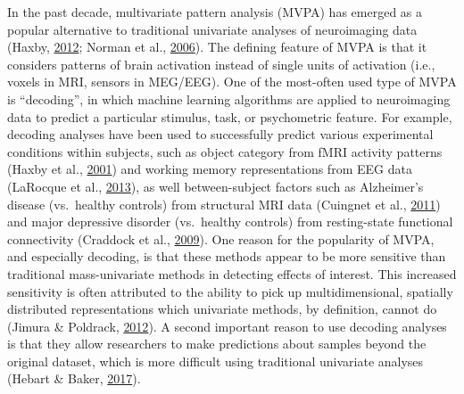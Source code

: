 \documentclass[12pt,american,a4paper,oneside,]{memoir} %
\begin{document}
In the past decade, multivariate pattern analysis (MVPA) has emerged as a popular alternative to traditional univariate analyses of neuroimaging data (Haxby, \protect\hyperlink{ref-Haxby2012-sd}{2012}; Norman et al., \protect\hyperlink{ref-norman2006beyond}{2006}). The defining feature of MVPA is that it considers patterns of brain activation instead of single units of activation (i.e., voxels in MRI, sensors in MEG/EEG). One of the most-often used type of MVPA is ``decoding'', in which machine learning algorithms are applied to neuroimaging data to predict a particular stimulus, task, or psychometric feature. For example, decoding analyses have been used to successfully predict various experimental conditions within subjects, such as object category from fMRI activity patterns (Haxby et al., \protect\hyperlink{ref-Haxby2001-os}{2001}) and working memory representations from EEG data (LaRocque et al., \protect\hyperlink{ref-LaRocque2013-sh}{2013}), as well between-subject factors such as Alzheimer's disease (vs.~healthy controls) from structural MRI data (Cuingnet et al., \protect\hyperlink{ref-Cuingnet2011-hv}{2011}) and major depressive disorder (vs.~healthy controls) from resting-state functional connectivity (Craddock et al., \protect\hyperlink{ref-Craddock2009-kz}{2009}). One reason for the popularity of MVPA, and especially decoding, is that these methods appear to be more sensitive than traditional mass-univariate methods in detecting effects of interest. This increased sensitivity is often attributed to the ability to pick up multidimensional, spatially distributed representations which univariate methods, by definition, cannot do (Jimura \& Poldrack, \protect\hyperlink{ref-Jimura2012-lv}{2012}). A second important reason to use decoding analyses is that they allow researchers to make predictions about samples beyond the original dataset, which is more difficult using traditional univariate analyses (Hebart \& Baker, \protect\hyperlink{ref-Hebart2017-jn}{2017}).
\end{document}
